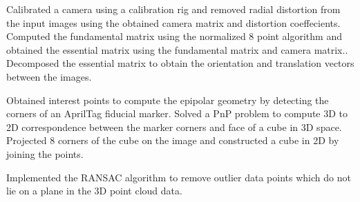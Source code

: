 \resumeItemListStart
\resumeItemDesc
{Calibrated a camera using a calibration rig and removed radial distortion from the input images using the obtained camera matrix and distortion coeffecients.}
\resumeItemDesc
{Computed the fundamental matrix using the normalized 8 point algorithm and obtained the essential matrix using the fundamental matrix and camera matrix..}
\resumeItemDesc
{Decomposed the essential matrix to obtain the orientation and translation vectors between the images.}
\resumeItemListEnd

\resumeItemListStart
\resumeItemDesc
{Obtained interest points to compute the epipolar geometry by detecting the corners of an AprilTag fiducial marker.}
\resumeItemDesc
{Solved a PnP problem to compute 3D to 2D correspondence between the marker corners and face of a cube in 3D space.}
\resumeItemDesc
{Projected 8 corners of the cube on the image and constructed a cube in 2D by joining the points. }
\resumeItemListEnd

\resumeItemListStart
\resumeItemDesc
{Implemented the RANSAC algorithm to remove outlier data points which do not lie on a plane in the 3D point cloud data.}
\resumeItemListEnd


